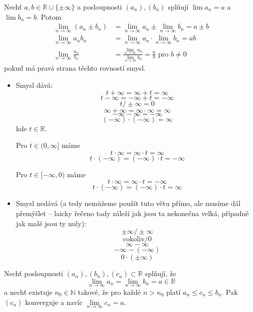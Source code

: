 \begin{theorem}
	Nechť $a, b \in \mathbb{R} \cup \{\pm \infty \}$ a posloupnosti $(a_n), (b_n)$ splňují $\lim a_n = a$ a $\lim b_n = b$.
	Potom
	\begin{align*}
			\lim_{n \rightarrow \infty}(a_n \pm b_n) &= \lim_{n \rightarrow \infty} a_n \pm \lim_{n \rightarrow \infty} b_n = a \pm b \\
			\lim_{n \rightarrow \infty}a_nb_n &= \lim_{n \rightarrow \infty} a_n \cdot \lim_{n \rightarrow \infty} b_n = ab \\
			\lim_{n \rightarrow \infty}\frac{a_n}{b_n} &= \frac{\lim_{n \rightarrow \infty} a_n}{\lim_{n \rightarrow \infty} b_n} = \frac{a}{b} \mbox{ pro } b \not= 0
	\end{align*}
	pokud má pravá strana těchto rovností smysl.
	\begin{itemize}

			\item Smysl dává:
				$$t + \infty = \infty + t = \infty$$
				$$t - \infty = -\infty + t = -\infty$$
				$$t / \pm \infty = 0$$
				$$\infty + \infty = \infty \cdot \infty = \infty$$
				$$-\infty - \infty = -\infty$$
				$$(-\infty) \cdot (- \infty) = \infty$$
				kde $t \in \mathbb{R}$.

				Pro $t \in (0, \infty]$ máme
				$$t \cdot \infty = \infty \cdot t = \infty$$
				$$t \cdot (-\infty) = (-\infty) \cdot t = -\infty$$
				
				Pro $t \in [-\infty, 0)$ máme
				$$t \cdot \infty = \infty \cdot t = -\infty$$
				$$t \cdot (-\infty) = (-\infty) \cdot t = \infty$$

			\item Smysl nedává (a tedy nemůžeme použít tuto větu přímo, ale musíme dál přemýšlet -- laicky řečeno tady záleží jak jsou ta nekonečna velká, případně jak malé jsou ty nuly):
				$$\pm \infty / \pm \infty$$
				$$\mbox{cokoliv}/0$$
				$$\infty - \infty$$
				$$-\infty - (-\infty)$$
				$$0 \cdot (\pm \infty)$$

	\end{itemize}
	\label{thm:veta_o_aritmetice_limit}
\end{theorem}

\begin{theorem}
	Nechť posloupnosti $(a_n), (b_n), (c_n) \subset \mathbb{R}$ splňují, že
	$$\underset{n \rightarrow \infty}{\lim} a_n = \underset{n \rightarrow \infty}{\lim} b_n = a \in \mathbb{R}$$
	a nechť existuje $n_0 \in \mathbb{N}$ takové, že pro každé $n > n_0$ platí $a_n \leq c_n \leq b_n$.
	Pak $(c_n)$ konverguje a navíc $\underset{n \rightarrow \infty}{\lim} c_n = a$.
	\label{thm:dva_policajti}
\end{theorem}

